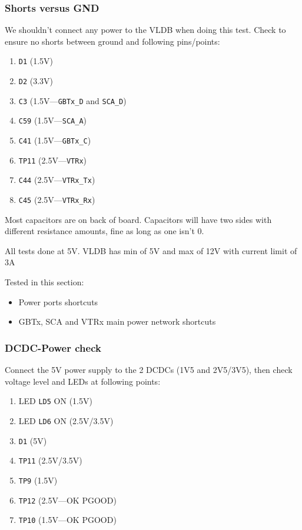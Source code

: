 \subsubsection{Shorts versus GND}
We shouldn't connect any power to the VLDB when doing this test.
Check to ensure no shorts between ground and following pins/points:

\begin{enumerate}
    \item \texttt{D1} (1.5V)
    \item \texttt{D2} (3.3V)
    \item \texttt{C3} (1.5V---\texttt{GBTx\_D} and \texttt{SCA\_D})
    \item \texttt{C59} (1.5V---\texttt{SCA\_A})
    \item \texttt{C41} (1.5V---\texttt{GBTx\_C})
    \item \texttt{TP11} (2.5V---\texttt{VTRx})
    \item \texttt{C44} (2.5V---\texttt{VTRx\_Tx})
    \item \texttt{C45} (2.5V---\texttt{VTRx\_Rx})
\end{enumerate}

\begin{leftbar}
    Most capacitors are on back of board. Capacitors will have two sides with
    different resistance amounts, fine as long as one isn't 0.
\end{leftbar}

\begin{leftbar}
    All tests done at 5V. VLDB has min of 5V and max of 12V with current limit
    of 3A
\end{leftbar}

Tested in this section:
\begin{itemize}
    \item Power ports shortcuts
    \item GBTx, SCA and VTRx main power network shortcuts
\end{itemize}


\subsubsection{DCDC-Power check}
Connect the 5V power supply to the 2 DCDCs (1V5 and 2V5/3V5), then check voltage
level and LEDs at following points:

\begin{enumerate}
    \item LED \texttt{LD5} ON (1.5V)
    \item LED \texttt{LD6} ON (2.5V/3.5V)
    \item \texttt{D1} (5V)
    \item \texttt{TP11} (2.5V/3.5V)
    \item \texttt{TP9} (1.5V)
    \item \texttt{TP12} (2.5V---OK PGOOD)
    \item \texttt{TP10} (1.5V---OK PGOOD)
\end{enumerate}

